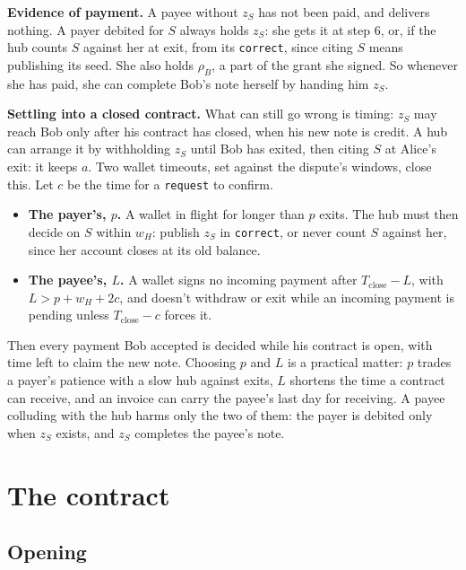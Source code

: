 \documentclass[11pt]{article}
\theoremstyle{plain}
\theoremstyle{definition}
\newcommand{\Tc}{T_{\mathrm{close}}}
\newcommand{\tx}[1]{\texttt{#1}}
\begin{document}
\textbf{Evidence of payment.} A payee without $z_S$ has not been paid,
and delivers nothing. A payer debited for $S$ always holds $z_S$: she
gets it at step 6, or, if the hub counts $S$ against her at exit, from
its \tx{correct}, since citing $S$ means publishing its seed. She also
holds $\rho_B$, a part of the grant she signed. So whenever she has
paid, she can complete Bob's note herself by handing him $z_S$.

\textbf{Settling into a closed contract.} What can still go wrong is
timing: $z_S$ may reach Bob only after his contract has closed, when his
new note is credit. A hub can arrange it by withholding $z_S$ until Bob
has exited, then citing $S$ at Alice's exit: it keeps $a$. Two wallet
timeouts, set against the dispute's windows, close this. Let $c$ be the
time for a \tx{request} to confirm.
\begin{itemize}[nosep]
\item \textbf{The payer's, $p$.} A wallet in flight for longer than $p$
  exits. The hub must then decide on $S$ within $w_H$: publish $z_S$ in
  \tx{correct}, or never count $S$ against her, since her account
  closes at its old balance.
\item \textbf{The payee's, $L$.} A wallet signs no incoming payment
  after $\Tc - L$, with $L > p + w_H + 2c$, and doesn't withdraw or exit
  while an incoming payment is pending unless $\Tc - c$ forces it.
\end{itemize}
Then every payment Bob accepted is decided while his contract is open,
with time left to claim the new note. Choosing $p$ and $L$ is a
practical matter: $p$ trades a payer's patience with a slow hub against
exits, $L$ shortens the time a contract can receive, and an invoice can
carry the payee's last day for receiving. A payee colluding with the
hub harms only the two of them: the payer is debited only when $z_S$
exists, and $z_S$ completes the payee's note.

\section{The contract}\label{sec:contract}

\subsection{Opening}\label{sec:opening}
\end{document}

